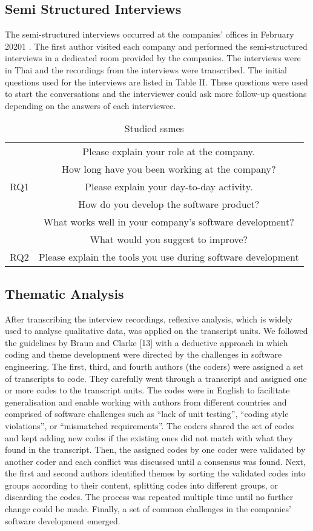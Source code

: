 \documentclass[conference]{IEEEtran}
\begin{document}
\subsection{Semi Structured Interviews}
The semi-structured interviews occurred at the companies’
offices in February 20201
. The first author visited each
company and performed the semi-structured interviews in a dedicated room provided by the companies. The interviews
were in Thai and the recordings from the interviews were
transcribed. The initial questions used for the interviews are
listed in Table II. These questions were used to start the
conversations and the interviewer could ask more follow-up
questions depending on the answers of each interviewee.

\begin{table}[htpb]
\caption{Studied ssmes}

\begin{tabular}{c c}
\hline 
& Please explain your role at the company.\\
& How long have you been working at the company? \\[0.5ex]
\hline  
RQ1 & Please explain your day-to-day activity.\\
&How do you develop the software product?\\
&What works well in your company’s software development?\\
&What would you suggest to improve?\\[0.5ex]
\hline
RQ2 & Please explain the tools you use during software development\\
\hline
\end{tabular}

\end{table}
\subsection{Thematic Analysis}
After transcribing the interview recordings, reflexive  analysis, which is widely used to analyse qualitative
data, was applied on the transcript units. We followed the
guidelines by Braun and Clarke [13] with a deductive approach
in which coding and theme development were directed by the
challenges in software engineering. The first, third, and fourth
authors (the coders) were assigned a set of transcripts to code.
They carefully went through a transcript and assigned one or
more codes to the transcript units. The codes were in English
to facilitate generalisation and enable working with authors
from different countries and comprised of software challenges such as “lack of unit testing”, “coding style
violations”, or “mismatched requirements”. The coders shared
the set of codes and kept adding new codes if the existing ones
did not match with what they found in the transcript. Then,
the assigned codes by one coder were validated by another
coder and each conflict was discussed until a consensus was
found. Next, the first and second authors identified themes
by sorting the validated codes into groups according to their
content, splitting codes into different groups, or discarding the
codes. The process was repeated multiple time until no further
change could be made. Finally, a set of common challenges
in the companies’ software development emerged.
\end{document}
